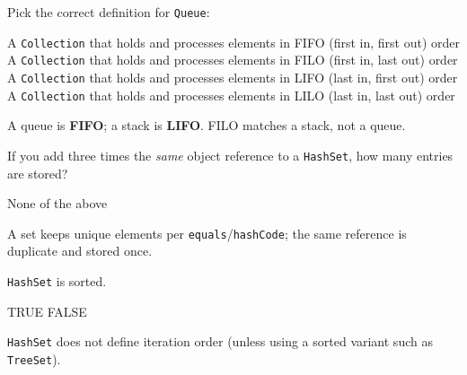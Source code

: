 \question[4]
Pick the correct definition for \texttt{Queue}:
\begin{choices}
  \CorrectChoice A \texttt{Collection} that holds and processes elements in FIFO (first in, first out) order
  \choice A \texttt{Collection} that holds and processes elements in FILO (first in, last out) order
  \choice A \texttt{Collection} that holds and processes elements in LIFO (last in, first out) order
  \choice A \texttt{Collection} that holds and processes elements in LILO (last in, last out) order
\end{choices}
\begin{solution}
  A queue is \textbf{FIFO}; a stack is \textbf{LIFO}. FILO matches a stack, not a queue.
\end{solution}

\question[4]
If you add three times the \emph{same} object reference to a \texttt{HashSet}, how many entries are stored?
\begin{choices}
  \choice None of the above
\end{choices}
\begin{solution}
  A set keeps unique elements per \texttt{equals}/\texttt{hashCode}; the same reference is duplicate and stored once.
\end{solution}

\question[4]
\texttt{HashSet} is sorted.
\begin{choices}
  \choice TRUE
  \CorrectChoice FALSE
\end{choices}
\begin{solution}
  \texttt{HashSet} does not define iteration order (unless using a sorted variant such as \texttt{TreeSet}).
\end{solution}

